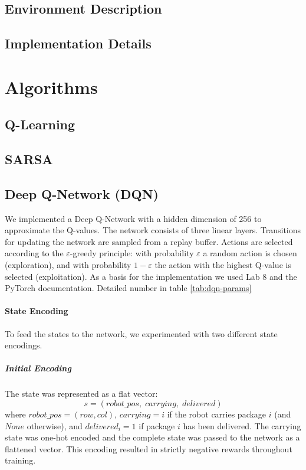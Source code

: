 \documentclass[a4paper,11pt]{article}
\theoremstyle{definition}
\begin{document}
\subsection{Environment Description}

\subsection{Implementation Details}


\section{Algorithms}

\subsection{Q-Learning}

\subsection{SARSA}
%

\subsection{Deep Q-Network (DQN)}

We implemented a Deep Q-Network with a hidden dimension of 256 to approximate the Q-values. 
The network consists of three linear layers.
Transitions for updating the network are sampled from a replay buffer.
Actions are selected according to the $\varepsilon$-greedy principle: with probability 
$\varepsilon$ a random action is chosen (exploration), and with probability $1-\varepsilon$ 
the action with the highest Q-value is selected (exploitation).
 As a basis for the implementation we used Lab 8 and the 
PyTorch documentation.
Detailed number in table \ref{tab:dqn-params}

\paragraph{State Encoding}
To feed the states to the network, we experimented with two different state encodings.

\subparagraph{Initial Encoding}
The state was represented as a flat vector:
\begin{equation}
    s = (\textit{robot\_pos},\; \textit{carrying},\; \textit{delivered})
\end{equation}
where $\textit{robot\_pos} = (row, col)$, $\textit{carrying} = i$ if the robot carries 
package $i$ (and $\textit{None}$ otherwise), and $\textit{delivered}_i = 1$ if package $i$ 
has been delivered. The carrying state was one-hot encoded and the complete state was passed 
to the network as a flattened vector. This encoding resulted in strictly negative rewards 
throughout training.
\end{document}
